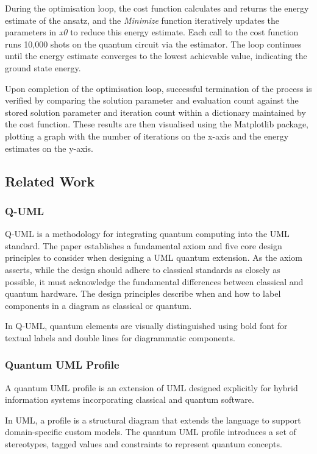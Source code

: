 \documentclass{article}
\begin{document}
During the optimisation loop, the cost function calculates and returns the energy estimate of the ansatz, and the \textit{Minimize} function iteratively updates the parameters in \textit{x0} to reduce this energy estimate. Each call to the cost function runs 10,000 shots on the quantum circuit via the estimator. The loop continues until the energy estimate converges to the lowest achievable value, indicating the ground state energy.

Upon completion of the optimisation loop, successful termination of the process is verified by comparing the solution parameter and evaluation count against the stored solution parameter and iteration count within a dictionary maintained by the cost function. These results are then visualised using the Matplotlib package, plotting a graph with the number of iterations on the x-axis and the energy estimates on the y-axis.

\subsection{Related Work}

\subsubsection{Q-UML}

Q-UML is a methodology for integrating quantum computing into the UML standard. The paper establishes a fundamental axiom and five core design principles to consider when designing a UML quantum extension. As the axiom asserts, while the design should adhere to classical standards as closely as possible, it must acknowledge the fundamental differences between classical and quantum hardware. The design principles describe when and how to label components in a diagram as classical or quantum.

In Q-UML, quantum elements are visually distinguished using bold font for textual labels and double lines for diagrammatic components. 

\subsubsection{Quantum UML Profile}

A quantum UML profile is an extension of UML designed explicitly for hybrid information systems incorporating classical and quantum software.

In UML, a profile is a structural diagram that extends the language to support domain-specific custom models. The quantum UML profile introduces a set of stereotypes, tagged values and constraints to represent quantum concepts. 
\end{document}
